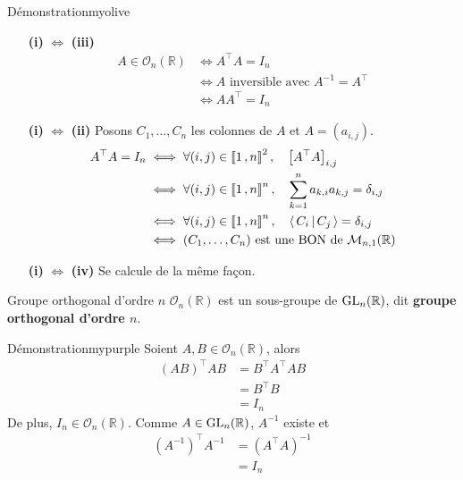     \begin{demo}{Démonstration}{myolive} 
        \begin{itemize}[leftmargin=2cm]
            \item[\textbf{(i)} $\iff$ \textbf{(iii)}] \begin{align*}
                A \in \mathcal{O}_n(\mathbb{R})
                &\iff A^{\top} A = I_n \\
                &\iff A \text{ inversible avec } A^{-1} = A^{\top} \\
                &\iff A A^{\top} = I_n
            \end{align*}
            \item[\textbf{(i)} $\iff$ \textbf{(ii)}] Posons $C_1,\ldots,C_n$ les colonnes de $A$ et $A = (a_{i,j})$. 
            \begin{align*}
                A^{\top} A = I_n 
                &\iff \forall (i,j) \in \left\llbracket 1 \, , n \right\rrbracket^2, \quad  \left[A^{\top} A\right]_{i,j} \\
                &\iff \forall (i,j) \in \left\llbracket 1 \, , n \right\rrbracket^n, \quad  \sum_{k=1}^{n} a_{k,i} a_{k,j} = \delta_{i,j} \\
                &\iff \forall (i,j) \in \left\llbracket 1 \, , n \right\rrbracket^n, \quad \left<\,C_i\,\middle|\,C_j\,\right> = \delta_{i,j} \\
                &\iff (C_1,\ldots,C_n) \text{ est une BON de } \mathcal{M}_{n,1}(\mathbb{R})
            \end{align*}
            \item[\textbf{(i)} $\iff$ \textbf{(iv)}] Se calcule de la même façon. 
        \end{itemize}
    \end{demo}

    \begin{defitheo}{Groupe orthogonal d’ordre $n$}{}
        $\mathcal{O}_n(\mathbb{R})$ est un sous-groupe de $\operatorname{GL}_n(\mathbb{R})$, dit \textbf{groupe orthogonal d’ordre $n$}. 
    \end{defitheo}

    \begin{demo}{Démonstration}{mypurple}
        Soient $A,B \in \mathcal{O}_n(\mathbb{R})$, alors 
        \begin{align*}
            (AB)^{\top} AB 
            &= B^{\top} A^{\top} A B \\
            &= B^{\top} B \\
            &= I_n
        \end{align*}
        De plus, $I_n \in \mathcal{O}_n(\mathbb{R})$. Comme $A \in \operatorname{GL}_n(\mathbb{R})$, $A^{-1}$ existe et 
        \begin{align*}
            (A^{-1})^{\top} A^{-1} 
            &= (A^{\top} A)^{-1} \\
            &= I_n
        \end{align*}
    \end{demo}

